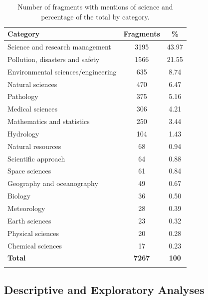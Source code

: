 \documentclass[pdflatex,sn-mathphys-num, iicol]{sn-jnl}
\begin{document}
	\begin{table}[t]
		\caption{Number of fragments with mentions of science and percentage of the total by category.}
		\label{tab:res_fragmentos_subcategoria}
		{\footnotesize
			\begin{tabular}{@{}p{4.2cm}cc@{}}
				\toprule
				\textbf{Category} & \textbf{Fragments} & \textbf{\%} \\
				\midrule
				Science and research management    & 3195 & 43.97 \\
				Pollution, disasters and safety    & 1566 & 21.55 \\
				Environmental sciences/engineering & 635  & 8.74  \\
				Natural sciences                   & 470  & 6.47  \\
				Pathology                          & 375  & 5.16  \\
				Medical sciences                   & 306  & 4.21  \\
				Mathematics and statistics         & 250  & 3.44  \\
				Hydrology                          & 104  & 1.43  \\
				Natural resources                  & 68   & 0.94  \\
				Scientific approach                & 64   & 0.88  \\
				Space sciences                     & 61   & 0.84  \\
				Geography and oceanography         & 49   & 0.67  \\
				Biology                            & 36   & 0.50  \\
				Meteorology                        & 28   & 0.39  \\
				Earth sciences                     & 23   & 0.32  \\
				Physical sciences                  & 20   & 0.28  \\
				Chemical sciences                  & 17   & 0.23  \\
				\midrule
				\textbf{Total}                     & \textbf{7267} & \textbf{100} \\
				\botrule
			\end{tabular}
		}
	\end{table}
	
	\subsection{Descriptive and Exploratory Analyses}\label{subsec:descriptive_results}
	
\end{document}
